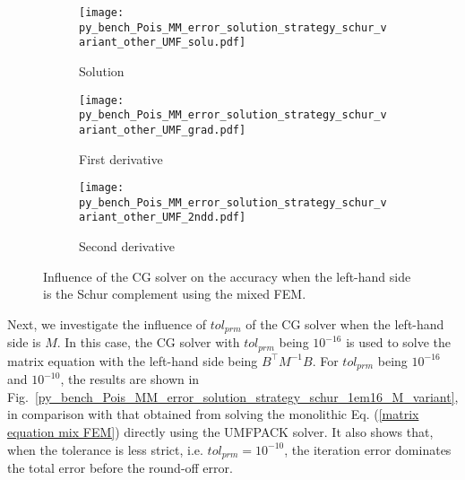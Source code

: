 \documentclass[review,3p]{elsarticle}
\begin{document}
\begin{figure}[!ht]
    \begin{subfigure}{5.5cm}
        \texttt{[image: py\_bench\_Pois\_MM\_error\_solution\_strategy\_schur\_variant\_other\_UMF\_solu.pdf]}
        \caption{Solution}
        \label{Fig:py_bench_Pois_MM_error_solution_strategy_schur_variant_other_UMF_solu}
    \end{subfigure}
    \hspace{-0.2cm}
    \begin{subfigure}{5.5cm}
        \texttt{[image: py\_bench\_Pois\_MM\_error\_solution\_strategy\_schur\_variant\_other\_UMF\_grad.pdf]}
        \caption{First derivative}
        \label{Fig:py_bench_Pois_MM_error_solution_strategy_schur_variant_other_UMF_grad}
    \end{subfigure}
    \hspace{-0.2cm}
    \begin{subfigure}{5.5cm}
        \texttt{[image: py\_bench\_Pois\_MM\_error\_solution\_strategy\_schur\_variant\_other\_UMF\_2ndd.pdf]}
        \caption{Second derivative}
        \label{Fig:py_bench_Pois_MM_error_solution_strategy_schur_variant_other_UMF_2ndd}
    \end{subfigure}
\caption{Influence of the CG solver on the accuracy when the left-hand side is the Schur complement using the mixed FEM.}
\label{Fig:py_bench_Pois_MM_error_solution_strategy_schur_variant_other_UMF}
\end{figure}

Next, we investigate the influence of $tol_{prm}$ of the CG solver when the left-hand side is $M$. In this case, the CG solver with $tol_{prm}$ being $10^{-16}$ is used to solve the matrix equation with the left-hand side being $B^{\top}M^{-1}B$. For $tol_{prm}$ being $10^{-16}$ and $10^{-10}$, the results are shown in Fig.~\ref{py_bench_Pois_MM_error_solution_strategy_schur_1em16_M_variant}, in comparison with that obtained from solving the monolithic Eq. (\ref{matrix equation mix FEM}) directly using the UMFPACK solver.
It also shows that, when the tolerance is less strict, i.e. $tol_{prm}=10^{-10}$, the iteration error dominates the total error before the round-off error.
\end{document}
